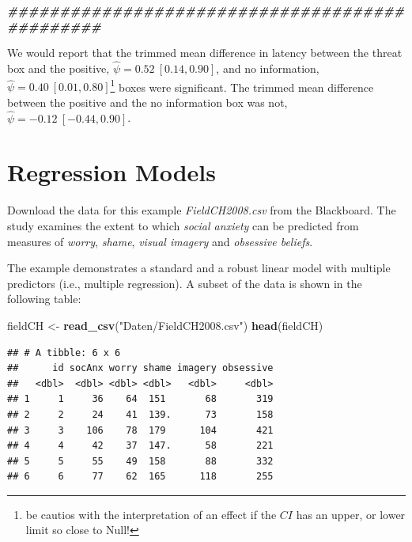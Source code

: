 \documentclass[
]{article}
\newenvironment{Shaded}{\begin{snugshade}}{\end{snugshade}}
\newcommand{\DocumentationTok}[1]{\textcolor[rgb]{0.56,0.35,0.01}{\textbf{\textit{#1}}}}
\newcommand{\FunctionTok}[1]{\textcolor[rgb]{0.13,0.29,0.53}{\textbf{#1}}}
\newcommand{\NormalTok}[1]{#1}
\newcommand{\OtherTok}[1]{\textcolor[rgb]{0.56,0.35,0.01}{#1}}
\newcommand{\StringTok}[1]{\textcolor[rgb]{0.31,0.60,0.02}{#1}}
\begin{document}
\begin{Shaded}
\begin{Highlighting}[]
  \DocumentationTok{\#\#\#\#\#\#\#\#\#\#\#\#\#\#\#\#\#\#\#\#\#\#\#\#\#\#\#\#\#\#\#\#\#\#\#\#\#\#\#\#\#\#\#\#\#\#\#}
\end{Highlighting}
\end{Shaded}

We would report that the trimmed mean difference in latency between the threat box and the positive, \(\hat{\psi} = 0.52 \ [0.14,0.90]\), and no information, \(\hat{\psi} = 0.40 \ [0.01,0.80]\)\footnote{be cautios with the interpretation of an effect if the \(CI\) has an upper, or lower limit so close to Null!} boxes were significant. The trimmed mean difference between the positive and the no information box was not, \(\hat{\psi} = -0.12 \ [-0.44,0.90]\).

\section*{Regression Models}\label{regression-models}

Download the data for this example \emph{FieldCH2008.csv} from the Blackboard. The study examines the extent to which \emph{social anxiety} can be predicted from measures of \emph{worry}, \emph{shame}, \emph{visual imagery} and \emph{obsessive beliefs}.

The example demonstrates a standard and a robust linear model with multiple predictors (i.e., multiple regression). A subset of the data is shown in the following table:

\begin{Shaded}
\begin{Highlighting}[]
\NormalTok{  fieldCH }\OtherTok{\textless{}{-}} \FunctionTok{read\_csv}\NormalTok{(}\StringTok{"Daten/FieldCH2008.csv"}\NormalTok{)}
  \FunctionTok{head}\NormalTok{(fieldCH)}
\end{Highlighting}
\end{Shaded}

\begin{verbatim}
## # A tibble: 6 x 6
##      id socAnx worry shame imagery obsessive
##   <dbl>  <dbl> <dbl> <dbl>   <dbl>     <dbl>
## 1     1     36    64  151       68       319
## 2     2     24    41  139.      73       158
## 3     3    106    78  179      104       421
## 4     4     42    37  147.      58       221
## 5     5     55    49  158       88       332
## 6     6     77    62  165      118       255
\end{verbatim}
\end{document}
